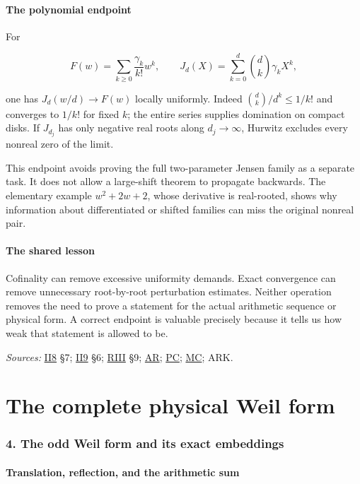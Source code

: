 \documentclass[
  10pt,
  a4paper,
  10pt,
  oneside,
  openany]{book}
\begin{document}
\subsection{The polynomial endpoint}\label{the-polynomial-endpoint}

For

\[
F(w)=\sum_{k\ge0}\frac{\gamma_k}{k!}w^k,
\qquad
J_d(X)=\sum_{k=0}^{d}\binom dk\gamma_kX^k,
\tag{3.7}\label{eq:3.7}
\]

one has \(J_d(w/d)\to F(w)\) locally uniformly. Indeed
\(\binom dk/d^k\le1/k!\) and converges to \(1/k!\) for fixed \(k\); the
entire series supplies domination on compact disks. If \(J_{d_j}\) has
only negative real roots along \(d_j\to\infty\), Hurwitz excludes every
nonreal zero of the limit.

This endpoint avoids proving the full two-parameter Jensen family as a
separate task. It does not allow a large-shift theorem to propagate
backwards. The elementary example \(w^2+2w+2\), whose derivative is
real-rooted, shows why information about differentiated or shifted
families can miss the original nonreal pair.

\subsection{The shared lesson}\label{the-shared-lesson}

Cofinality can remove excessive uniformity demands. Exact convergence
can remove unnecessary root-by-root perturbation estimates. Neither
operation removes the need to prove a statement for the actual
arithmetic sequence or physical form. A correct endpoint is valuable
precisely because it tells us how weak that statement is allowed to be.

\emph{Sources:} \hyperref[source-ii8]{II8} §7;
\hyperref[source-ii9]{II9} §6; \hyperref[source-riii]{RIII} §9;
\hyperref[source-ar]{AR}; \hyperref[source-pc]{PC};
\hyperref[source-mc]{MC}; ARK.

\part{The complete physical Weil form}

\section{4. The odd Weil form and its exact embeddings}\label{ch-weil}

\subsection{Translation, reflection, and the arithmetic
sum}\label{translation-reflection-and-the-arithmetic-sum}
\end{document}
